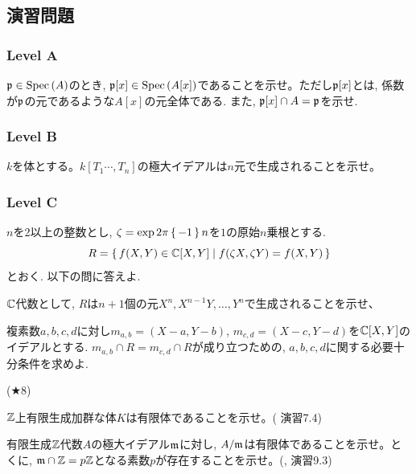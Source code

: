 \newpage

\subsection{演習問題}

\subsubsection{Level A}
\begin{prob}
$\mathfrak{p}\in \mathrm{Spec}\left( A \right)$のとき, $\mathfrak{p}[x]\in \mathrm{Spec}\left( A[x] \right)$であることを示せ。ただし$\mathfrak{p}[x]$とは, 係数が$\mathfrak{p}$の元であるような$A[x]$の元全体である. また, $\mathfrak{p}[x]\cap A = \mathfrak{p}$を示せ.
\end{prob}


\subsubsection{Level B}
\begin{prob}
$k$を体とする。$k[T_1\cdots, T_n]$の極大イデアルは$n$元で生成されることを示せ。
\end{prob}



\subsubsection{Level C}
\begin{prob}
$n$を2以上の整数とし, $\zeta = \exp{2\pi \set{-1} n}$を$1$の原始$n$乗根とする.
\[R = \set{f(X,Y) \in \mathbb{C}[X,Y] \mid f(\zeta X, \zeta Y) = f(X,Y)}\]
とおく. 以下の問に答えよ.
\ben
\item $\mathbb{C}$代数として, $R$は$n+1$個の元$X^n,X^{n-1}Y,\dots, Y^n$で生成されることを示せ、
\item 複素数$a,b,c,d$に対し$m_{a,b}=(X-a,Y-b)$, $m_{c,d} = (X-c,Y-d)$を$\mathbb{C}[X,Y]$のイデアルとする. $m_{a,b}\cap R = m_{c,d} \cap R$が成り立つための, $a,b,c,d$に関する必要十分条件を求めよ.
\een

\end{prob}

\begin{prob} ($\bigstar 8$) \label{prob:atimac_prop7.8_apply}
\ben
\item $\mathbb{Z}$上有限生成加群な体$K$は有限体であることを示せ。(\cite{atiyah} 演習7.4)
\item 有限生成$\mathbb{Z}$代数$A$の極大イデアル$\mathfrak{m}$に対し, $A/\mathfrak{m}$は有限体であることを示せ。とくに, $\mathfrak{m}\cap \mathbb{Z} = p\mathbb{Z}$となる素数$p$が存在することを示せ。(\cite{gotou}, 演習9.3)
\een
\end{prob}

